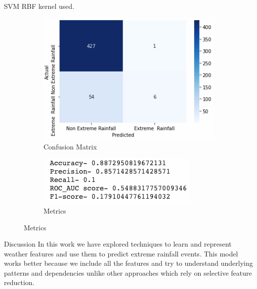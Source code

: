 \documentclass[11pt]{beamer}
\begin{document}
\begin{frame}{SVM}
RBF kernel used. 
\begin{figure}[!h]
\begin{subfigure}{.5\textwidth}
\centering
\includegraphics[width=\linewidth]{svm_mumbai.png}
\caption{Confusion Matrix}
\end{subfigure}%
\begin{subfigure}{.5\textwidth}
\centering
\includegraphics[width=.8\linewidth]{svm_metrics.png}
\caption{Metrics}
\end{subfigure}
\end{figure}
\end{frame}


\begin{frame}{Discussion}
In this work we have explored techniques to learn and represent weather features and use them to predict extreme rainfall events. This model works better because we include all the features and try to understand underlying patterns and dependencies unlike other approaches which rely on selective feature reduction.
\end{frame}
\end{document}
